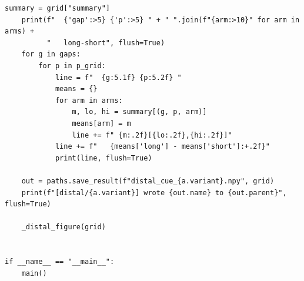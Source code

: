 \begin{lstlisting}[caption={mrl\_trace/distal\_cue.py},label={lst:siox-src-distal_cue}]
    summary = grid["summary"]
    print(f"  {'gap':>5} {'p':>5} " + " ".join(f"{arm:>10}" for arm in arms) +
          "   long-short", flush=True)
    for g in gaps:
        for p in p_grid:
            line = f"  {g:5.1f} {p:5.2f} "
            means = {}
            for arm in arms:
                m, lo, hi = summary[(g, p, arm)]
                means[arm] = m
                line += f" {m:.2f}[{lo:.2f},{hi:.2f}]"
            line += f"   {means['long'] - means['short']:+.2f}"
            print(line, flush=True)

    out = paths.save_result(f"distal_cue_{a.variant}.npy", grid)
    print(f"[distal/{a.variant}] wrote {out.name} to {out.parent}", flush=True)

    _distal_figure(grid)


if __name__ == "__main__":
    main()
\end{lstlisting}

